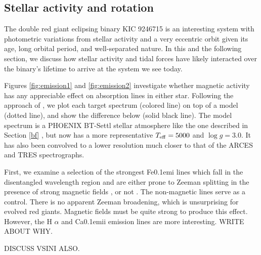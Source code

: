 \subsection{Stellar activity and rotation}\label{actrot}
The double red giant eclipsing binary KIC 9246715 is an interesting system with photometric variations from stellar activity and a very eccentric orbit given its age, long orbital period, and well-separated nature. In this and the following section, we discuss how stellar activity and tidal forces have likely interacted over the binary's lifetime to arrive at the system we see today.

Figures \ref{fig:emission1} and \ref{fig:emission2} investigate whether magnetic activity has any appreciable effect on absorption lines in either star. Following the approach of \citet{fro12}, we plot each target spectrum (colored line) on top of a model (dotted line), and show the difference below (solid black line). The model spectrum is a PHOENIX BT-Settl stellar atmosphere like the one described in Section \ref{bf} \citep{all03,asp09}, but now has a more representative $T_{\rm{eff}} = 5000$ and $\log g = 3.0$. It has also been convolved to a lower resolution much closer to that of the ARCES and TRES spectrographs.

First, we examine a selection of the strongest {\rm Fe}\kern 0.1em{\sc i} lines which fall in the disentangled wavelength region and are either prone to Zeeman splitting in the presence of strong magnetic fields \citep{har73}, or not \citep{sis70}. The non-magnetic lines serve as a control. There is no apparent Zeeman broadening, which is unsurprising for evolved red giants. Magnetic fields must be quite strong to produce this effect. However, the H $\alpha$ and {\rm Ca}\kern 0.1em{\sc ii} emission lines are more interesting. WRITE ABOUT WHY.

DISCUSS VSINI ALSO.
  
  
  
  